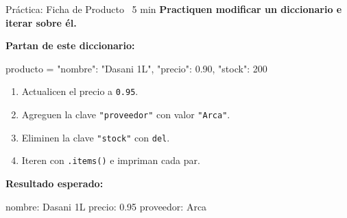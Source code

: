 \documentclass[aspectratio=169, 11pt]{beamer}
\begin{document}
\begin{frame}[fragile,shrink=30]{Práctica: Ficha de Producto \hfill
    {\normalsize\color{arcaRed}\faClock\ 5 min}}
  \vspace{-6pt}
  {\small\color{arcaDark}\bfseries
    Practiquen modificar un diccionario e iterar sobre él.}

  \vspace{4pt}
  {\footnotesize\color{arcaDark}\bfseries Partan de este diccionario:}
  \vspace{2pt}
  \begin{pyblock}
producto = {"nombre": "Dasani 1L", "precio": 0.90, "stock": 200}
  \end{pyblock}

  \vspace{4pt}
  {\footnotesize
  \begin{enumerate}\setlength{\itemsep}{4pt}
    \item Actualicen el precio a \texttt{0.95}.
    \item Agreguen la clave \texttt{"proveedor"} con valor \texttt{"Arca"}.
    \item Eliminen la clave \texttt{"stock"} con \texttt{del}.
    \item Iteren con \texttt{.items()} e impriman cada par.
  \end{enumerate}
  }

  \vspace{4pt}
  {\footnotesize\color{arcaDark}\bfseries Resultado esperado:}
  \vspace{2pt}
  \begin{outputblock}
nombre: Dasani 1L
precio: 0.95
proveedor: Arca
  \end{outputblock}
\end{frame}
\end{document}
